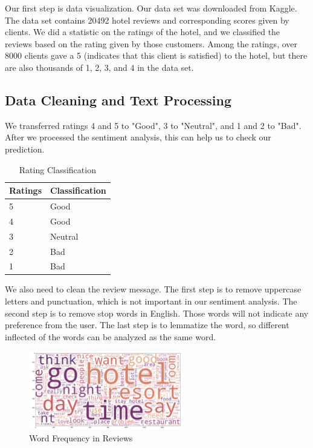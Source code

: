 \documentclass{article}
\begin{document}
Our first step is data visualization. Our data set was downloaded from Kaggle. The data set contains 20492 hotel reviews and corresponding scores given by clients. We did a statistic on the ratings of the hotel, and we classified the reviews based on the rating given by those customers. Among the ratings, over 8000 clients gave a 5 (indicates that this client is satisfied) to the hotel, but there are also thousands of 1, 2, 3, and 4 in the data set.


\subsection{Data Cleaning and Text Processing}
\begin{flushleft}
We transferred ratings 4 and 5 to "Good", 3 to "Neutral", and 1 and 2 to "Bad". After we processed the sentiment analysis, this can help us to check our prediction. 

\begin{table}[h]
\centering
\begin{tabular}{m|m}
Ratings & Classification \\\hline
5 & Good \\
4 & Good \\
3 & Neutral \\
2 & Bad \\
1 & Bad
\end{tabular}
\caption{\label{tab:widgets}Rating Classification}
\end{table}
\end{flushleft}

\noindent
We also need to clean the review message. The first step is to remove uppercase letters and punctuation, which is not important in our sentiment analysis. The second step is to remove stop words in English. Those words will not indicate any preference from the user. The last step is to lemmatize the word, so different inflected of the words can be analyzed as the same word. \newline

\begin{figure}[h]
    \centering
    \includegraphics[width=0.6\textwidth]{wordFreqency.png}
    \caption{Word Frequency in Reviews}
    \label{fig:my_label}
\end{figure}
\end{document}
